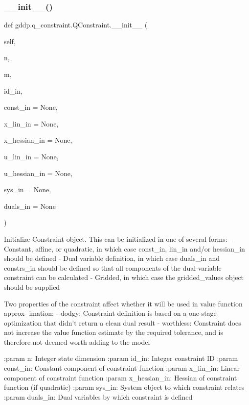 \subsubsection{\texorpdfstring{\_\_init\_\_()}{\_\_init\_\_()}}
{\footnotesize\ttfamily def gddp.\+q\+\_\+constraint.\+Q\+Constraint.\+\_\+\+\_\+init\+\_\+\+\_\+ (\begin{DoxyParamCaption}\item[{}]{self,  }\item[{}]{n,  }\item[{}]{m,  }\item[{}]{id\+\_\+in,  }\item[{}]{const\+\_\+in = {\ttfamily None},  }\item[{}]{x\+\_\+lin\+\_\+in = {\ttfamily None},  }\item[{}]{x\+\_\+hessian\+\_\+in = {\ttfamily None},  }\item[{}]{u\+\_\+lin\+\_\+in = {\ttfamily None},  }\item[{}]{u\+\_\+hessian\+\_\+in = {\ttfamily None},  }\item[{}]{sys\+\_\+in = {\ttfamily None},  }\item[{}]{duals\+\_\+in = {\ttfamily None} }\end{DoxyParamCaption})}

\begin{DoxyVerb}Initialize Constraint object. This can be initialized in one of several forms:
- Constant, affine, or quadratic, in which case const_in, lin_in and/or hessian_in should
    be defined
- Dual variable definition, in which case duals_in and constrs_in should be defined so that
    all components of the dual-variable constraint can be calculated
- Gridded, in which case the gridded_values object should be supplied

Two properties of the constraint affect whether it will be used in value function approx-
imation:
- dodgy: Constraint definition is based on a one-stage optimization that didn't return a
clean dual result
- worthless: Constraint does not increase the value function estimate by the required
tolerance, and is therefore not deemed worth adding to the model

:param n: Integer state dimension
:param id_in: Integer constraint ID
:param const_in: Constant component of constraint function
:param x_lin_in: Linear component of constraint function
:param x_hessian_in: Hessian of constraint function (if quadratic)
:param sys_in: System object to which constraint relates
:param duals_in: Dual variables by which constraint is defined
\end{DoxyVerb}
 

